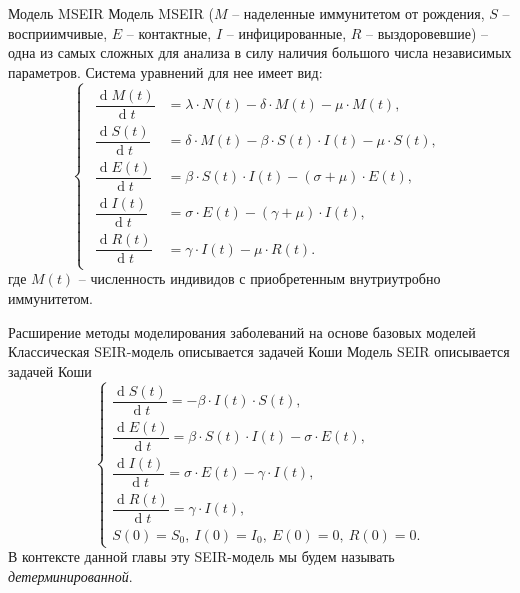 \documentclass[notheorems]{beamer}
\renewcommand{\d}{\operatorname{d}}
\begin{document}

\begin{frame}
	{Модель MSEIR}
	Модель MSEIR ($M$ -- наделенные иммунитетом от рождения, $S$ -- восприимчивые, $E$ -- контактные, $I$ -- инфицированные, $R$ -- выздоровевшие) -- одна из самых сложных для анализа в силу наличия большого числа независимых параметров. Система уравнений для нее имеет вид:
	\begin{equation}
		\left\{ 
		\begin{gathered} 
			\begin{aligned}
				\dfrac {\d M(t)}{\d t} &= \lambda\cdot N(t) - \delta\cdot M(t)-\mu\cdot M(t),\\
				\dfrac {\d S(t)}{\d t} &= \delta \cdot M(t) -\beta\cdot S(t)\cdot I(t) - \mu \cdot S(t),\\
				\dfrac {\d E(t)}{\d t} &= \beta \cdot S(t)\cdot I(t) - (\sigma + \mu)\cdot E(t),\\
				\dfrac{\d I(t)}{\d t} &=\sigma \cdot E(t) - (\gamma + \mu)\cdot I(t),\\
				\dfrac{\d R(t)}{\d t} &= \gamma\cdot I(t) - \mu \cdot R(t). 
			\end{aligned}
		\end{gathered} 
		\right.
	\end{equation}
	где $M (t)$ -- численность индивидов с приобретенным внутриутробно иммунитетом.
\end{frame}




\begin{frame}
	{Расширение методы моделирования заболеваний на основе базовых моделей}
	Классическая SEIR-модель описывается задачей Коши
	Модель SEIR описывается задачей Коши
	\begin{equation*}
		\begin{cases}
			\dfrac {\d S(t)}{\d t} = - \beta \cdot I(t)\cdot S(t),\\
			\dfrac {\d E(t)}{\d t} = \beta \cdot S(t)\cdot I(t) - \sigma\cdot E(t),\\
			\dfrac{\d I(t)}{\d t} =\sigma \cdot E(t) - \gamma\cdot I(t),\\
			\dfrac{\d R(t)}{\d t} = \gamma\cdot I(t),\\
			S(0) = S_0,\ I(0) = I_0,\ E(0) = 0,\ R(0) = 0.
		\end{cases}
	\end{equation*}
	В контексте данной главы эту SEIR-модель мы будем называть \textit{детерминированной}.
\end{frame}
\end{document}
